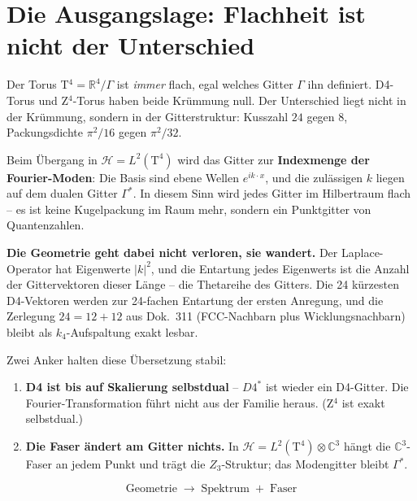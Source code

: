 \documentclass[11pt]{report}
\begin{document}
\chapter{Die Ausgangslage: Flachheit ist nicht der Unterschied}

Der Torus T$^4 = \mathbb{R}^4/\Gamma$ ist \emph{immer} flach, egal
welches Gitter $\Gamma$ ihn definiert. D4-Torus und Z$^4$-Torus
haben beide Krümmung null. Der Unterschied liegt nicht in der
Krümmung, sondern in der Gitterstruktur: Kusszahl $24$ gegen $8$,
Packungsdichte $\pi^2/16$ gegen $\pi^2/32$.

Beim Übergang in $\mathcal{H} = L^2(\text{T}^4)$ wird das Gitter zur
\textbf{Indexmenge der Fourier-Moden}: Die Basis sind ebene Wellen
$e^{ik\cdot x}$, und die zulässigen $k$ liegen auf dem dualen Gitter
$\Gamma^{*}$. In diesem Sinn wird jedes Gitter im Hilbertraum
flach -- es ist keine Kugelpackung im Raum mehr, sondern ein
Punktgitter von Quantenzahlen.

\textbf{Die Geometrie geht dabei nicht verloren, sie wandert.} Der
Laplace-Operator hat Eigenwerte $|k|^2$, und die Entartung jedes
Eigenwerts ist die Anzahl der Gittervektoren dieser Länge -- die
Thetareihe des Gitters. Die 24 kürzesten D4-Vektoren werden zur
24-fachen Entartung der ersten Anregung, und die Zerlegung
$24 = 12+12$ aus Dok.~311 (FCC-Nachbarn plus Wicklungsnachbarn)
bleibt als $k_4$-Aufspaltung exakt lesbar.

Zwei Anker halten diese Übersetzung stabil:

\begin{enumerate}
  \item \textbf{D4 ist bis auf Skalierung selbstdual} -- $D4^{*}$
        ist wieder ein D4-Gitter. Die Fourier-Transformation führt
        nicht aus der Familie heraus. (Z$^4$ ist exakt selbstdual.)
  \item \textbf{Die Faser ändert am Gitter nichts.} In
        $\mathcal{H} = L^2(\text{T}^4)\otimes\mathbb{C}^3$ hängt die
        $\mathbb{C}^3$-Faser an jedem Punkt und trägt die
        $Z_3$-Struktur; das Modengitter bleibt $\Gamma^{*}$.
\end{enumerate}

\begin{equation}
  \boxed{\;\text{Geometrie}\;\longrightarrow\;
  \text{Spektrum}\;+\;\text{Faser}\;}
\end{equation}
\end{document}
